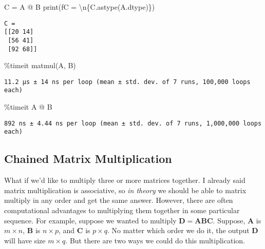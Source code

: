 \documentclass[
  letterpaper,
  DIV=11,
  numbers=noendperiod]{scrreprt}
\newenvironment{Shaded}{\begin{snugshade}}{\end{snugshade}}
\newcommand{\BuiltInTok}[1]{\textcolor[rgb]{0.00,0.23,0.31}{#1}}
\newcommand{\CharTok}[1]{\textcolor[rgb]{0.13,0.47,0.30}{#1}}
\newcommand{\NormalTok}[1]{\textcolor[rgb]{0.00,0.23,0.31}{#1}}
\newcommand{\OperatorTok}[1]{\textcolor[rgb]{0.37,0.37,0.37}{#1}}
\newcommand{\SpecialCharTok}[1]{\textcolor[rgb]{0.37,0.37,0.37}{#1}}
\newcommand{\SpecialStringTok}[1]{\textcolor[rgb]{0.13,0.47,0.30}{#1}}
\begin{document}
\begin{Shaded}
\begin{Highlighting}[]
\NormalTok{C }\OperatorTok{=}\NormalTok{ A }\OperatorTok{@}\NormalTok{ B}
\BuiltInTok{print}\NormalTok{(}\SpecialStringTok{f\textquotesingle{}C = }\CharTok{\textbackslash{}n}\SpecialCharTok{\{}\NormalTok{C}\SpecialCharTok{.}\NormalTok{astype(A.dtype)}\SpecialCharTok{\}}\SpecialStringTok{\textquotesingle{}}\NormalTok{)}
\end{Highlighting}
\end{Shaded}

\begin{verbatim}
C = 
[[20 14]
 [56 41]
 [92 68]]
\end{verbatim}

\begin{Shaded}
\begin{Highlighting}[]
\OperatorTok{\%}\NormalTok{timeit matmul(A, B)}
\end{Highlighting}
\end{Shaded}

\begin{verbatim}
11.2 µs ± 14 ns per loop (mean ± std. dev. of 7 runs, 100,000 loops each)
\end{verbatim}

\begin{Shaded}
\begin{Highlighting}[]
\OperatorTok{\%}\NormalTok{timeit A }\OperatorTok{@}\NormalTok{ B}
\end{Highlighting}
\end{Shaded}

\begin{verbatim}
892 ns ± 4.44 ns per loop (mean ± std. dev. of 7 runs, 1,000,000 loops each)
\end{verbatim}

\hypertarget{chained-matrix-multiplication}{%
\subsection{Chained Matrix
Multiplication}\label{chained-matrix-multiplication}}

What if we'd like to multiply three or more matrices together. I already
said matrix multiplication is associative, so \emph{in theory} we should
be able to matrix multiply in any order and get the same answer.
However, there are often computational advantages to multiplying them
together in some particular sequence. For example, suppose we wanted to
multiply \(\mathbf{D} = \mathbf{A}\mathbf{B}\mathbf{C}\). Suppose,
\(\mathbf{A}\) is \(m \times n\), \(\mathbf{B}\) is \(n \times p\), and
\(\mathbf{C}\) is \(p \times q\). No matter which order we do it, the
output \(\mathbf{D}\) will have size \(m \times q\). But there are two
ways we could do this multiplication.
\end{document}
